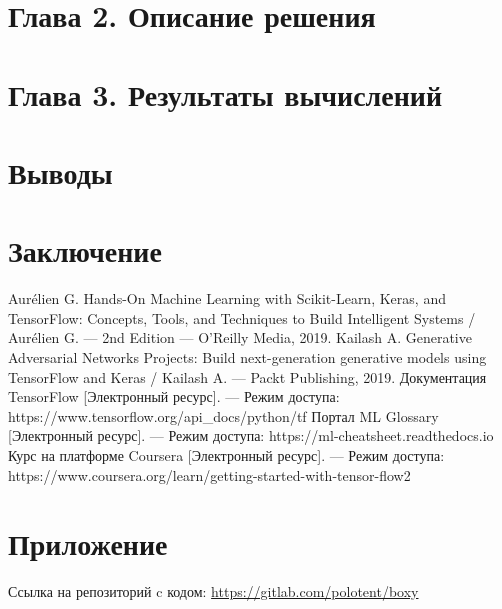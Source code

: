 \documentclass[14pt]{article}
\begin{document}
\section*{Глава 2. Описание решения}

\section*{Глава 3. Результаты вычислений}

\section*{Выводы}

\section*{Заключение}

\begin{thebibliography}{3}
Aurélien G. Hands-On Machine Learning with Scikit-Learn, Keras, and TensorFlow: Concepts, Tools, and Techniques to Build Intelligent Systems / Aurélien G. --- 2nd Edition --- O'Reilly Media, 2019.
Kailash A. Generative Adversarial Networks Projects: Build next-generation generative models using TensorFlow and Keras / Kailash A. ---  Packt Publishing, 2019.
Документация TensorFlow [Электронный ресурс]. --- Режим доступа: https://www.tensorflow.org/api\_docs/python/tf
Портал ML Glossary [Электронный ресурс]. --- Режим доступа: https://ml-cheatsheet.readthedocs.io
Курс на платформе Coursera [Электронный ресурс]. --- Режим доступа: https://www.coursera.org/learn/getting-started-with-tensor-flow2
\end{thebibliography}

\section*{Приложение}
Ссылка на репозиторий c кодом: \url{https://gitlab.com/polotent/boxy}
\restoregeometry
\end{document}
